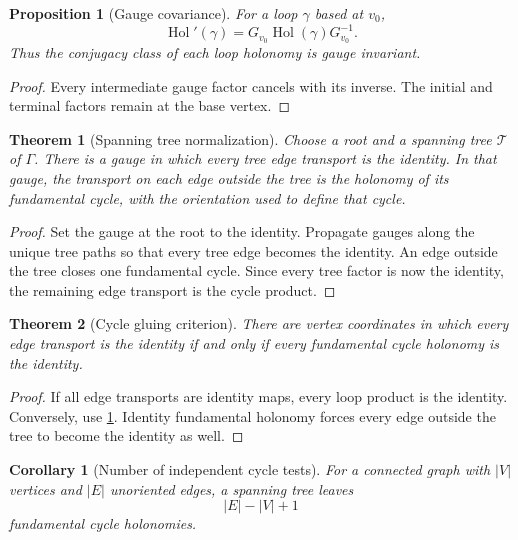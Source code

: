 \documentclass{aomart}
\newtheorem{theorem}{Theorem}[section]
\newtheorem{proposition}[proposition]{Proposition}
\newtheorem{corollary}[corollary]{Corollary}
\theoremstyle{definition}
\theoremstyle{remark}
\newcommand{\Tcal}{\mathcal T}
\newcommand{\Hol}{\operatorname{Hol}}
\begin{document}
\begin{proposition}[Gauge covariance]\label{prop:gauge_covariance}
For a loop $\gamma$ based at $v_0$,
\[
\Hol'(\gamma)
=
G_{v_0}\Hol(\gamma)G_{v_0}^{-1}.
\]
Thus the conjugacy class of each loop holonomy is gauge invariant.
\end{proposition}

\begin{proof}
Every intermediate gauge factor cancels with its inverse.  The initial and terminal factors remain at the base vertex.
\end{proof}

\begin{theorem}[Spanning tree normalization]\label{thm:tree_normalization}
Choose a root and a spanning tree $\Tcal$ of $\Gamma$.  There is a gauge in which every tree edge transport is the identity.  In that gauge, the transport on each edge outside the tree is the holonomy of its fundamental cycle, with the orientation used to define that cycle.
\end{theorem}

\begin{proof}
Set the gauge at the root to the identity.  Propagate gauges along the unique tree paths so that every tree edge becomes the identity.  An edge outside the tree closes one fundamental cycle.  Since every tree factor is now the identity, the remaining edge transport is the cycle product.
\end{proof}

\begin{theorem}[Cycle gluing criterion]\label{thm:cycle_gluing}
There are vertex coordinates in which every edge transport is the identity if and only if every fundamental cycle holonomy is the identity.
\end{theorem}

\begin{proof}
If all edge transports are identity maps, every loop product is the identity.  Conversely, use \cref{thm:tree_normalization}.  Identity fundamental holonomy forces every edge outside the tree to become the identity as well.
\end{proof}

\begin{corollary}[Number of independent cycle tests]\label{cor:cycle_number}
For a connected graph with $|V|$ vertices and $|E|$ unoriented edges, a spanning tree leaves
\[
|E|-|V|+1
\]
fundamental cycle holonomies.
\end{corollary}
\end{document}
